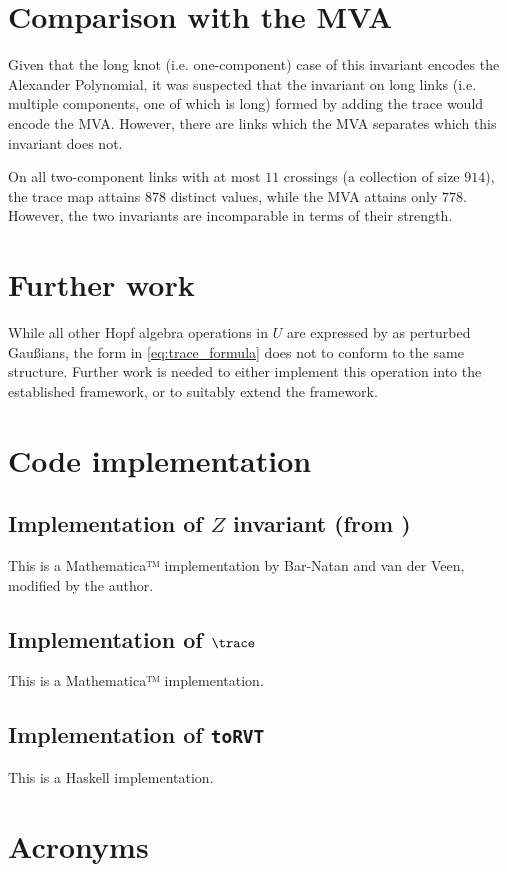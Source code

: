 \documentclass{article}
\begin{document}
\section{Comparison with the \ac{MVA}}

Given that the long knot (i.e. one-component) case of this invariant
encodes the Alexander Polynomial, it was suspected that the invariant on long
links (i.e. multiple components, one of which is long) formed by adding the
trace would encode the \ac{MVA}. However, there are links which the \ac{MVA}
separates which this invariant does not.

On all two-component links with at most $11$ crossings (a collection of size
$914$), the trace map attains $878$ distinct values, while the MVA attains only
$778$. However, the two invariants are incomparable in terms of their strength.

\section{Further work}
While all other Hopf algebra operations in $U$ are expressed by \cite{BV} as
perturbed Gaußians, the form in \cref{eq:trace_formula} does not to conform to
the same structure. Further work is needed to either implement this operation
into the established framework, or to suitably extend the framework.

\appendix

\section{Code implementation}

\subsection{Implementation of $Z$ invariant (from \cite{BV})}

This is a Mathematica™ implementation by Bar-Natan and van der Veen, modified by
the author.

\subsection{Implementation of $\trace$}

This is a Mathematica™ implementation.

\subsection{Implementation of \lstinline|toRVT|}

This is a Haskell implementation.

\section{Acronyms}
\begin{acronym}
\end{acronym}

\printbibliography
\end{document}
